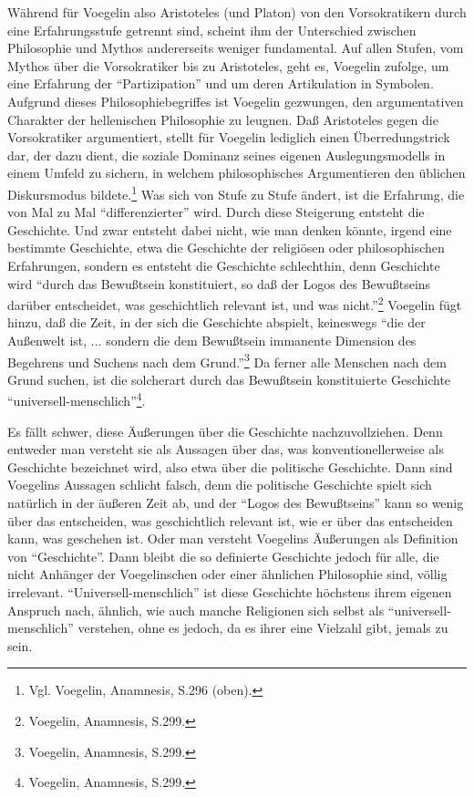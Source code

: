 Während für Voegelin also Aristoteles (und Platon) von den
Vorsokratikern durch eine Erfahrungsstufe getrennt sind, scheint ihm der
Unterschied zwischen Philosophie und Mythos andererseits weniger
fundamental. Auf allen Stufen, vom Mythos über die Vorsokratiker bis zu
Aristoteles, geht es, Voegelin zufolge, um eine Erfahrung der
"`Partizipation"' und um deren Artikulation in Symbolen.  Aufgrund
dieses Philosophiebegriffes ist Voegelin gezwungen, den argumentativen
Charakter der hellenischen Philosophie zu leugnen. Daß Aristoteles gegen
die Vorsokratiker argumentiert, stellt für Voegelin lediglich einen
Überredungstrick dar, der dazu dient, die soziale Dominanz seines
eigenen Auslegungsmodells in einem Umfeld zu sichern, in welchem
philosophisches Argumentieren den üblichen Diskursmodus
bildete.\footnote{Vgl. Voegelin, Anamnesis, S.296 (oben).} Was sich von
Stufe zu Stufe ändert, ist die Erfahrung, die von Mal zu Mal
"`differenzierter"' wird. Durch diese Steigerung entsteht die
Geschichte. Und zwar entsteht dabei nicht, wie man denken könnte, irgend
eine bestimmte Geschichte, etwa die Geschichte der religiösen oder
philosophischen Erfahrungen, sondern es entsteht die Geschichte
schlechthin, denn Geschichte wird "`durch das Bewußtsein konstituiert,
so daß der Logos des Bewußtseins darüber entscheidet, was geschichtlich
relevant ist, und was nicht."'\footnote{Voegelin, Anamnesis, S.299.}
Voegelin fügt hinzu, daß die Zeit, in der sich die Geschichte abspielt,
keineswegs "`die der Außenwelt ist, ... sondern die dem Bewußtsein
immanente Dimension des Begehrens und Suchens nach dem
Grund."'\footnote{Voegelin, Anamnesis, S.299.}  Da ferner alle Menschen
nach dem Grund suchen, ist die solcherart durch das Bewußtsein
konstituierte Geschichte "`universell-menschlich"'\footnote{Voegelin,
  Anamnesis, S.299.}.
 
Es fällt schwer, diese Äußerungen über die Geschichte nachzuvollziehen. Denn
entweder man versteht sie als Aussagen über das, was konventionellerweise als
Geschichte bezeichnet wird, also etwa über die politische Geschichte. Dann
sind Voegelins Aussagen schlicht falsch, denn die politische Geschichte spielt
sich natürlich in der äußeren Zeit ab, und der "`Logos des Bewußtseins"' kann
so wenig über das entscheiden, was geschichtlich relevant ist, wie er über das
entscheiden kann, was geschehen ist. Oder man versteht Voegelins Äußerungen
als Definition von "`Geschichte"'. Dann bleibt die so definierte Geschichte
jedoch für alle, die nicht Anhänger der Voegelinschen oder einer ähnlichen
Philosophie sind, völlig irrelevant.  "`Universell-menschlich"' ist diese
Geschichte höchstens ihrem eigenen Anspruch nach, ähnlich, wie auch manche
Religionen sich selbst als "`universell-menschlich"' verstehen, ohne es
jedoch, da es ihrer eine Vielzahl gibt, jemals zu sein.

